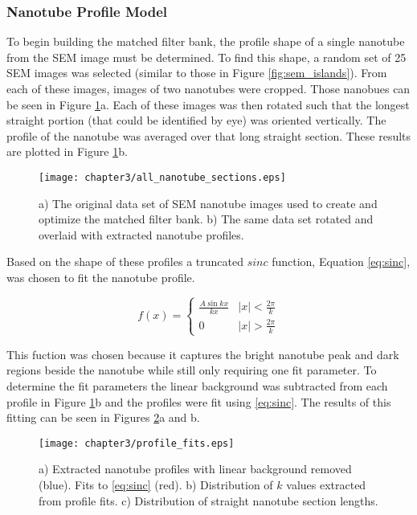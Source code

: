 \subsubsection{Nanotube Profile Model}

To begin building the matched filter bank, the profile shape of a single nanotube from the SEM image must be determined. To find this shape, a random set of 25 SEM images was selected (similar to those in Figure \ref{fig:sem_islands}). From each of these images, images of two nanotubes were cropped. Those nanobues can be seen in Figure \ref{fig:all_nanotube_sections}a. Each of these images was then rotated such that the longest straight portion (that could be identified by eye) was oriented vertically. The profile of the nanotube was averaged over that long straight section. These results are plotted in Figure \ref{fig:all_nanotube_sections}b.

\begin{figure}
	\centering
	\texttt{[image: chapter3/all\_nanotube\_sections.eps]}
	\caption{a) The original data set of SEM nanotube images used to create and optimize the matched filter bank. b) The same data set rotated and overlaid with extracted nanotube profiles.}
	\label{fig:all_nanotube_sections}
\end{figure}

Based on the shape of these profiles a truncated $sinc$ function, Equation \ref{eq:sinc}, was chosen to fit the nanotube profile.

\begin{equation} 
\label{eq:sinc}
f(x) = \begin{cases} \frac{A\sin{kx}}{kx} & |x| < \frac{2\pi}{k} \\ 
                     0                    & |x| > \frac{2\pi}{k} 
       \end{cases}
\end{equation}

This fuction was chosen because it captures the bright nanotube peak and dark regions beside the nanotube while still only requiring one fit parameter. To determine the fit parameters the linear background was subtracted from each profile in Figure \ref{fig:all_nanotube_sections}b and the profiles were  fit using \ref{eq:sinc}. The results of this fitting can be seen in Figures \ref{fig:profile_fits}a and b. 

\begin{figure}
	\centering
	\texttt{[image: chapter3/profile\_fits.eps]}
	\caption{a) Extracted nanotube profiles with linear background removed (blue). Fits to \ref{eq:sinc} (red). b) Distribution of $k$ values extracted from profile fits. c) Distribution of straight nanotube section lengths.}
	\label{fig:profile_fits}
\end{figure}


